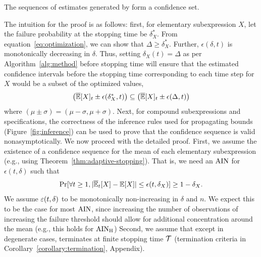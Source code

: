 \begin{theorem}
\label{thm:conf-seq}
The sequences of estimates generated by \AVOIRmethodname{} form a confidence set.
\end{theorem}

The intuition for the proof is as follows: first, for elementary subexpression $X$, let the failure probability at the stopping time be $\delta^*_X$.
From equation~\ref{eq:optimization}, we can show that $\Delta \geq \delta^*_X$.
Further, $\epsilon(\delta, t)$ is monotonically decreasing in $\delta$.
Thus, setting $\delta_X(t) = \Delta$ as per Algorithm~\ref{alg:method} before stopping time will ensure that the estimated confidence intervals before the stopping time corresponding to each time step for $X$ would be a subset of the optimized values, 
\[
 \left(\overline{\mathbb{E}}[X]_t \pm \epsilon(\delta^*_X, t)\right) \subseteq \left(\overline{\mathbb{E}}[X]_t \pm \epsilon(\Delta, t)\right) 
\]
where $\left(\mu \pm \sigma\right) = \left(\mu - \sigma, \mu + \sigma\right)$.
Next, for compound subexpressions and specifications, the correctness of the inference rules used for propagating bounds (Figure~\ref{fig:inference}) can be used to prove that the confidence sequence is valid nonasymptotically.
We now proceed with the detailed proof.
First, we assume the existence of a confidence sequence for the mean of each elementary subexpression (e.g., using Theorem~\ref{thm:adaptive-stopping}). 
That is, we need an $\rm{AIN}$ for $\epsilon(t, \delta)$ such that
\begin{equation}
    \Pr[\forall t \geq 1, |\overline{\mathbb{E}}_t[X] - \mathbb{E}[X]| \leq \epsilon(t, \delta_X)] \geq 1 - \delta_X.
    \label{eqn:conf-seq:elementary:assumed}
\end{equation}
We assume $\varepsilon(t, \delta)$ to be monotonically non-increasing in $\delta$ and $n$. 
We expect this to be the case for most $\rm{AIN}$, since increasing the number of observations of increasing the failure threshold should allow for additional concentration around the mean (e.g., this holds for $\rm{AIN}_H$)
Second, we assume that except in degenerate cases, \AVOIRmethodname{} terminates at finite stopping time ${\mathcal{T}}$ (termination criteria in Corollary~\ref{corollary:termination}, Appendix). 

